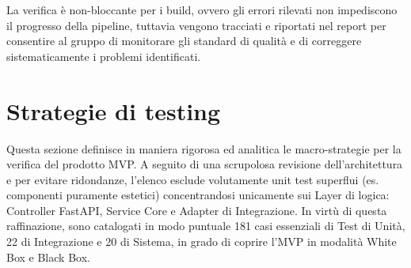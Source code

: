 \documentclass[a4paper,11pt,oneside]{scrartcl}
\begin{document}
La verifica è non-bloccante per i build, ovvero gli errori rilevati non impediscono il progresso della pipeline, tuttavia vengono tracciati e riportati nel report per consentire al gruppo di monitorare gli standard di qualità e di correggere sistematicamente i problemi identificati.

\section{Strategie di testing}

Questa sezione definisce in maniera rigorosa ed analitica le macro-strategie per la verifica del prodotto MVP. A seguito di una scrupolosa revisione dell'architettura e per evitare ridondanze, l'elenco esclude volutamente unit test superflui (es. componenti puramente estetici) concentrandosi unicamente sui Layer di logica: Controller FastAPI, Service Core e Adapter di Integrazione. In virtù di questa raffinazione, sono catalogati in modo puntuale 181 casi essenziali di Test di Unità, 22 di Integrazione e 20 di Sistema, in grado di coprire l'MVP in modalità White Box e Black Box.
\end{document}
